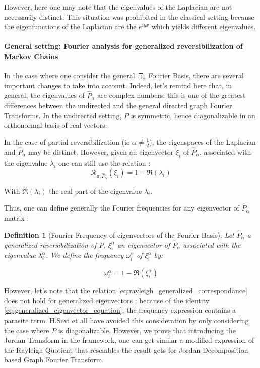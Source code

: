 \documentclass[sn-mathphys]{sn-jnl}%
\theoremstyle{thmstyleone}%
\theoremstyle{thmstyletwo}%
\theoremstyle{thmstylethree}%
\newtheorem{definition}[theo]{Definition}
\begin{document}
However, here one may note that the eigenvalues of the Laplacian are
not necessarily distinct. This situation was prohibited in the
classical setting because the eigenfunctions of the Laplacian are the
$e^{iyx}$ which yields different eigenvalues.


\paragraph{General setting: Fourier analysis for generalized reversibilization of Markov Chains}
In the case where one consider the general $\Xi_\alpha$ Fourier Basis,
there are several important changes to take into account. Indeed,
let's remind here that, in general, the eigenvalues of
$\hat{P}_\alpha$ are complex numbers: this is one of the greatest
differences between the undirected and the general directed graph
Fourier Transforms. In the undirected setting, $P$ is symmetric, hence
diagonalizable in an orthonormal basis of real vectors.

In the case of partial reversibilization (ie
$\alpha \neq \frac{1}{2}$), the eigenspaces of the Laplacian and
$\hat{P}_\alpha$ may be distinct. However, given an eigenvector
$\xi_i$ of $\hat{P}_\alpha$, associated with the eigenvalue
$\lambda_i$ one can still use the relation :
\begin{equation}\label{eq:rayleigh_generalized_correspondance}
    \mathcal{R}_{\pi, \hat{P}_\alpha}(\xi_i) = 1 - \Re(\lambda_i)
\end{equation}

With $\Re(\lambda_i)$ the real part of the eigenvalue $\lambda_i$.

Thus, one can define generally the Fourier frequencies for any
eigenvector of $\hat{P}_\alpha$ matrix :

\begin{definition}[Fourier Frequency of eigenvectors of the Fourier Basis]

  Let $\hat{P}_\alpha$ a generalized reversibilization of $P$,
  $\xi^\alpha_i$ an eigenvector of $\hat{P}_\alpha$ associated with
  the eigenvalue $\lambda^\alpha_i$. We define the frequency
  $\omega^\alpha_i$ of $\xi^\alpha_i$ by:

\begin{equation}
    \omega^\alpha_i = 1- \Re(\xi^\alpha_i)
\end{equation}

\end{definition}

However, let's note that the relation
\ref{eq:rayleigh_generalized_correspondance} does not hold for
generalized eigenvectors : because of the identity
\ref{eq:generalized_eigenvector_equation}, the frequency expression
contains a parasite term. H.Sevi et all \cite{sevi2019} have avoided
this consideration by only considering the case where $P$ is
diagonalizable. However, we prove that introducing the Jordan
Transform in the \cite{sevi2019} framework, one can get similar a
modified expression of the Rayleigh Quotient that resembles the result
\cite{sandryhaila_moura_2014} gets for Jordan Decomposition based
Graph Fourier Transform.
\end{document}
